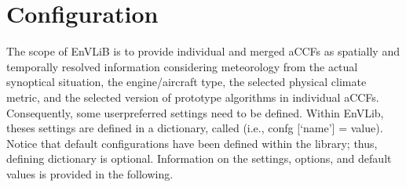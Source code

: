 \documentclass[a4paper,11pt,english]{sphinxmanual}
\begin{document}
\section{Configuration}
\label{\detokenize{gStarted:configuration}}
The scope of EnVLiB is to provide individual and merged aCCFs as spatially and temporally resolved information considering meteorology from the actual synoptical situation, the engine/aircraft type, the selected physical climate metric, and the selected version of prototype algorithms in individual aCCFs. Consequently, some user\sphinxhyphen{}preferred settings need to
be defined. Within EnVLib, theses settings are defined in a dictionary, called  (i.e., confg {[}‘name’{]} = value). Notice that default
configurations have been defined within the library; thus, defining dictionary  is optional. Information on the settings, options, and default values is provided in the following.
\end{document}
